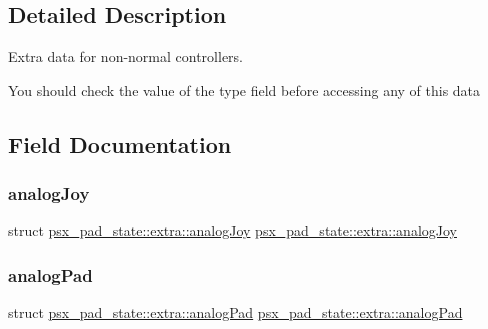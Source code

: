 \subsection{Detailed Description}
Extra data for non-\/normal controllers. 

You should check the value of the type field before accessing any of this data 

\subsection{Field Documentation}
\mbox{\label{unionpsx__pad__state_1_1extra_a371441709cf4b2cde155a14098f31d78}} 
\subsubsection{\texorpdfstring{analog\+Joy}{analogJoy}}
{\footnotesize\ttfamily struct \hyperlink{structpsx__pad__state_1_1extra_1_1analogJoy}{psx\+\_\+pad\+\_\+state\+::extra\+::analog\+Joy} \hyperlink{structpsx__pad__state_1_1extra_1_1analogJoy}{psx\+\_\+pad\+\_\+state\+::extra\+::analog\+Joy}}

\mbox{\label{unionpsx__pad__state_1_1extra_a695297f806918f29e75ce3b60b8a023c}} 
\subsubsection{\texorpdfstring{analog\+Pad}{analogPad}}
{\footnotesize\ttfamily struct \hyperlink{structpsx__pad__state_1_1extra_1_1analogPad}{psx\+\_\+pad\+\_\+state\+::extra\+::analog\+Pad} \hyperlink{structpsx__pad__state_1_1extra_1_1analogPad}{psx\+\_\+pad\+\_\+state\+::extra\+::analog\+Pad}}

\mbox{\label{unionpsx__pad__state_1_1extra_add4e14f1a60c319b3db982fc94fa0bba}} 
